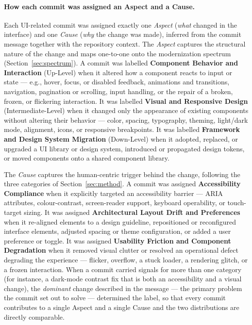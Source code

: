 \paragraph{How each commit was assigned an Aspect and a Cause.}
Each UI-related commit was assigned exactly one \emph{Aspect} (\emph{what}
changed in the interface) and one \emph{Cause} (\emph{why} the change was
made), inferred from the commit message together with the repository
context. The \emph{Aspect} captures the structural nature of the change and
maps one-to-one onto the modernization spectrum
(Section~\ref{sec:spectrum}). A commit was labelled \textbf{Component
Behavior and Interaction} (Up-Level) when it altered how a component reacts
to input or state --- e.g., hover, focus, or disabled feedback, animations
and transitions, navigation, pagination or scrolling, input handling, or the
repair of a broken, frozen, or flickering interaction. It was labelled
\textbf{Visual and Responsive Design} (Intermediate-Level) when it changed
only the appearance of existing components without altering their behavior
--- color, spacing, typography, theming, light/dark mode, alignment, icons,
or responsive breakpoints. It was labelled \textbf{Framework and Design
System Migration} (Down-Level) when it adopted, replaced, or upgraded a UI
library or design system, introduced or propagated design tokens, or moved
components onto a shared component library.

The \emph{Cause} captures the human-centric trigger behind the change,
following the three categories of Section~\ref{sec:method}. A commit was
assigned \textbf{Accessibility Compliance} when it explicitly targeted an
accessibility barrier --- ARIA attributes, colour-contrast, screen-reader
support, keyboard operability, or touch-target sizing. It was assigned
\textbf{Architectural Layout Drift and Preferences} when it re-aligned
elements to a design guideline, repositioned or reconfigured interface
elements, adjusted spacing or theme configuration, or added a user
preference or toggle. It was assigned \textbf{Usability Friction and
Component Degradation} when it removed visual clutter or resolved an
operational defect degrading the experience --- flicker, overflow, a stuck
loader, a rendering glitch, or a frozen interaction. When a commit carried
signals for more than one category (for instance, a dark-mode contrast fix
that is both an accessibility and a visual change), the \emph{dominant}
change described in the message --- the primary problem the commit set out
to solve --- determined the label, so that every commit contributes to a
single Aspect and a single Cause and the two distributions are directly
comparable.
